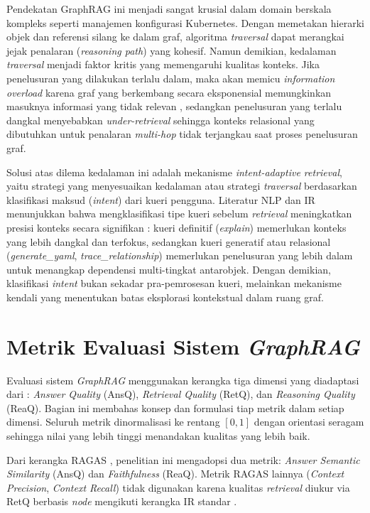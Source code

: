 Pendekatan GraphRAG ini menjadi sangat krusial dalam domain berskala kompleks seperti manajemen konfigurasi Kubernetes. Dengan memetakan hierarki objek dan referensi silang ke dalam graf, algoritma \textit{traversal} dapat merangkai jejak penalaran (\textit{reasoning path}) yang kohesif. Namun demikian, kedalaman \textit{traversal} menjadi faktor kritis yang memengaruhi kualitas konteks. Jika penelusuran yang dilakukan terlalu dalam, maka akan memicu \textit{information overload} karena graf yang berkembang secara eksponensial memungkinkan masuknya informasi yang tidak relevan \parencite{han_graphrag_2024}, sedangkan penelusuran yang terlalu dangkal menyebabkan \textit{under-retrieval} sehingga konteks relasional yang dibutuhkan untuk penalaran \textit{multi-hop} tidak terjangkau saat proses penelusuran graf.

Solusi atas dilema kedalaman ini adalah mekanisme \textit{intent-adaptive retrieval}, yaitu strategi yang menyesuaikan kedalaman atau strategi \textit{traversal} berdasarkan klasifikasi maksud (\textit{intent}) dari kueri pengguna. Literatur NLP dan IR menunjukkan bahwa mengklasifikasi tipe kueri sebelum \textit{retrieval} meningkatkan presisi konteks secara signifikan \parencite{zhao_rag_survey_2024}: kueri definitif (\textit{explain}) memerlukan konteks yang lebih dangkal dan terfokus, sedangkan kueri generatif atau relasional (\textit{generate\_yaml}, \textit{trace\_relationship}) memerlukan penelusuran yang lebih dalam untuk menangkap dependensi multi-tingkat antarobjek. Dengan demikian, klasifikasi \textit{intent} bukan sekadar pra-pemrosesan kueri, melainkan mekanisme kendali yang menentukan batas eksplorasi kontekstual dalam ruang graf.

\section{Metrik Evaluasi Sistem \textit{GraphRAG}}
\label{sec:metrik-evaluasi}

Evaluasi sistem \textit{GraphRAG} menggunakan kerangka tiga dimensi yang diadaptasi dari \textcite{ma_llm_kg_2025}: \textit{Answer Quality} (AnsQ), \textit{Retrieval Quality} (RetQ), dan \textit{Reasoning Quality} (ReaQ). Bagian ini membahas konsep dan formulasi tiap metrik dalam setiap dimensi. Seluruh metrik dinormalisasi ke rentang $[0,1]$ dengan orientasi seragam sehingga nilai yang lebih tinggi menandakan kualitas yang lebih baik.

Dari kerangka RAGAS \parencite{es_ragas_2023}, penelitian ini mengadopsi dua metrik: \textit{Answer Semantic Similarity} (AnsQ) dan \textit{Faithfulness} (ReaQ). Metrik RAGAS lainnya (\textit{Context Precision}, \textit{Context Recall}) tidak digunakan karena kualitas \textit{retrieval} diukur via RetQ berbasis \textit{node} mengikuti kerangka IR standar \parencite{manning_ir_2008}.

